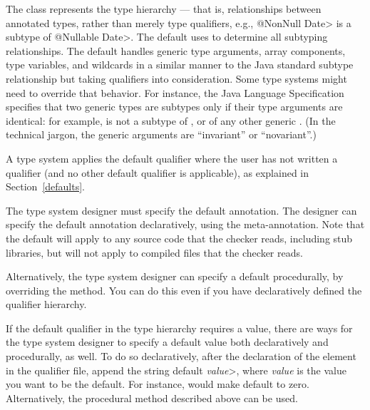 The  class represents the type hierarchy ---
that is, relationships between
annotated types, rather than merely type qualifiers, e.g., \<@NonNull
Date> is a subtype of \<@Nullable Date>.  The default  uses
 to determine all subtyping relationships.
The default  handles
generic type arguments, array components, type variables, and
wildcards in a similar manner to the Java standard subtype
relationship but taking qualifiers into consideration.  Some type
systems might need to override that behavior.  For instance, the Java
Language Specification specifies that two generic types are subtypes only
if their type arguments are identical:  for example,
 is not a subtype of , or of any other
generic .
(In the technical jargon, the generic arguments are ``invariant'' or ``novariant''.)



A type system applies the default qualifier where the user has not written a
qualifier (and no other default qualifier is applicable), as explained in
Section~\ref{defaults}.

The type system designer must specify the default annotation. The designer can specify the default annotation declaratively,
using the 
meta-annotation.
Note that the default will apply to any source code that the checker reads,
including stub libraries, but will not apply to compiled 
files that the checker reads.

\begin{sloppypar}
Alternatively, the type system designer can specify a default procedurally,
by overriding the
method.  You can do this even if you have declaratively defined the
qualifier hierarchy.
\end{sloppypar}

If the default qualifier in the type hierarchy requires a value, there are
ways for the type system designer to specify a default value both
declaratively and procedurally, as well.  To do so declaratively, after the
declaration of the element in the qualifier file, append the string
\<default \emph{value}>, where \emph{value} is the value you want to be the
default.  For instance,  would make
 default to zero. Alternatively, the procedural method
described above can be used.

